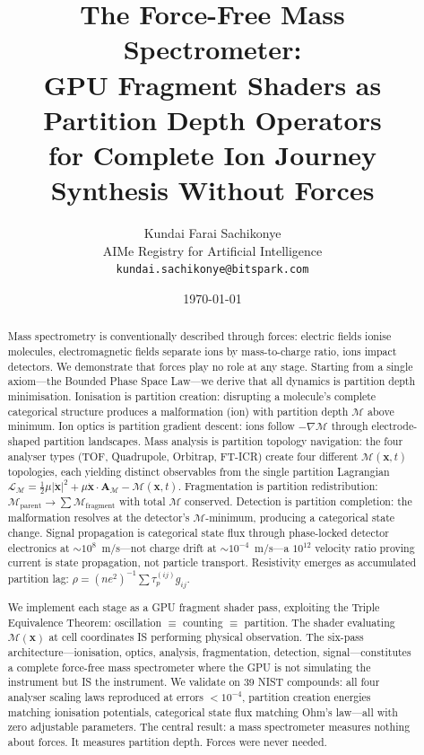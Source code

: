 \documentclass[11pt,twocolumn,a4paper]{article}
\theoremstyle{definition}
\theoremstyle{remark}
\newcommand{\Depth}{\mathcal{M}}
\newcommand{\partinert}{\mu}
\newcommand{\taup}{\tau_p}
\newcommand{\Apartition}{\mathbf{A}_{\mathcal{M}}}
\newcommand{\Lagr}{\mathcal{L}}
\begin{document}
\title{\textbf{The Force-Free Mass Spectrometer: \\
GPU Fragment Shaders as Partition Depth Operators \\
for Complete Ion Journey Synthesis Without Forces}}

\author{
Kundai Farai Sachikonye\\[0.3em]
AIMe Registry for Artificial Intelligence\\[0.3em]
\texttt{kundai.sachikonye@bitspark.com}
}

\date{\today}

\maketitle

\begin{abstract}
Mass spectrometry is conventionally described through forces: electric fields ionise molecules, electromagnetic fields separate ions by mass-to-charge ratio, ions impact detectors. We demonstrate that forces play no role at any stage. Starting from a single axiom---the Bounded Phase Space Law---we derive that all dynamics is partition depth minimisation. Ionisation is partition creation: disrupting a molecule's complete categorical structure produces a malformation (ion) with partition depth $\Depth$ above minimum. Ion optics is partition gradient descent: ions follow $-\nabla\Depth$ through electrode-shaped partition landscapes. Mass analysis is partition topology navigation: the four analyser types (TOF, Quadrupole, Orbitrap, FT-ICR) create four different $\Depth(\mathbf{x},t)$ topologies, each yielding distinct observables from the single partition Lagrangian $\Lagr_\Depth = \frac{1}{2}\partinert|\dot{\mathbf{x}}|^2 + \partinert\dot{\mathbf{x}}\cdot\Apartition - \Depth(\mathbf{x},t)$. Fragmentation is partition redistribution: $\Depth_{\mathrm{parent}} \to \sum \Depth_{\mathrm{fragment}}$ with total $\Depth$ conserved. Detection is partition completion: the malformation resolves at the detector's $\Depth$-minimum, producing a categorical state change. Signal propagation is categorical state flux through phase-locked detector electronics at $\sim 10^8$~m/s---not charge drift at $\sim 10^{-4}$~m/s---a $10^{12}$ velocity ratio proving current is state propagation, not particle transport. Resistivity emerges as accumulated partition lag: $\rho = (ne^2)^{-1}\sum \taup^{(ij)} g_{ij}$.

We implement each stage as a GPU fragment shader pass, exploiting the Triple Equivalence Theorem: oscillation $\equiv$ counting $\equiv$ partition. The shader evaluating $\Depth(\mathbf{x})$ at cell coordinates IS performing physical observation. The six-pass architecture---ionisation, optics, analysis, fragmentation, detection, signal---constitutes a complete force-free mass spectrometer where the GPU is not simulating the instrument but IS the instrument. We validate on 39 NIST compounds: all four analyser scaling laws reproduced at errors $<10^{-4}$, partition creation energies matching ionisation potentials, categorical state flux matching Ohm's law---all with zero adjustable parameters. The central result: a mass spectrometer measures nothing about forces. It measures partition depth. Forces were never needed.


\end{abstract}
\end{document}
